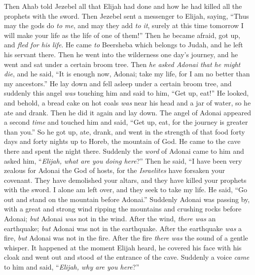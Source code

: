 \begin{biblechapter} %
 Then Ahab told Jezebel all that Elijah had done and how he had killed all the prophets with the sword.
\verse Then Jezebel sent a messenger to Elijah, saying, “Thus may the gods do \textit{to me}, and may they add \textit{to it}, surely at this time tomorrow I will make your life as the life of one of them!”
\verse Then he became afraid, got up, and \textit{fled for his life}. He came \textit{to} Beersheba which belongs to Judah, and he left his servant there.
\verse Then he went into the wilderness one day’s journey, and he went and sat under a certain broom tree. Then \textit{he asked Adonai that he might die}, and he said, “It is enough now, Adonai; take my life, for I am no better than my ancestors.”
\verse He lay down and fell asleep under a certain broom tree, and suddenly this angel \textit{was} touching him and said to him, “Get up, eat!”
\verse He looked, and behold, a bread cake on hot coals \textit{was} near his head and a jar of water, so he ate and drank. Then he did it again and lay down.
\verse The angel of Adonai appeared a second \textit{time} and touched him and said, “Get up, eat, for the journey is greater than you.”
\verse So he got up, ate, drank, and went in the strength of that food forty days and forty nights up to Horeb, the mountain of God.
 He came to the cave there and spent the night there. Suddenly the \textit{word} of Adonai came to him and asked him, “\textit{Elijah, what are you doing here}?”
\verse Then he said, “I have been very zealous for Adonai the God of hosts, for the \textit{Israelites} have forsaken your covenant. They have demolished your altars, and they have killed your prophets with the sword. I alone am left over, and they seek to take my life.
\verse He said, “Go out and stand on the mountain before Adonai.” Suddenly Adonai was passing by, with a great and strong wind ripping the mountains and crushing rocks before Adonai; \textit{but} Adonai \textit{was} not in the wind. After the wind, \textit{there was} an earthquake; \textit{but} Adonai was not in the earthquake.
\verse After the earthquake \textit{was} a fire, \textit{but} Adonai was not in the fire. After the fire \textit{there was} the sound of a gentle whisper.
\verse It happened at the moment Elijah heard, he covered his face with his cloak and went out and stood \textit{at} the entrance of the cave. Suddenly a voice \textit{came} to him and said, “\textit{Elijah, why are you here}?”

\end{biblechapter}
